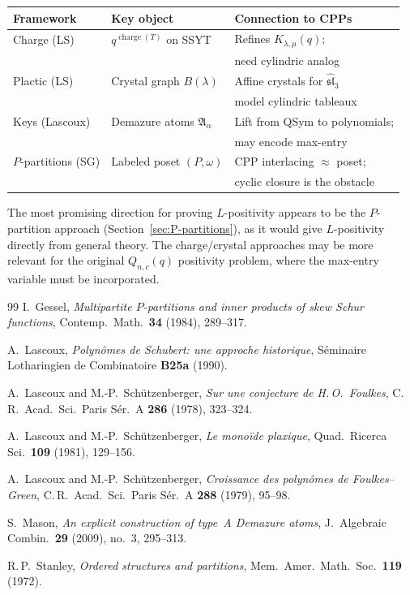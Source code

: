 \documentclass[11pt]{article}
\newcommand{\charge}{\operatorname{charge}}
\begin{document}
\begin{center}
\begin{tabular}{l|l|l}
  \textbf{Framework} & \textbf{Key object} & \textbf{Connection to CPPs} \\
  \hline
  Charge (LS) & $q^{\charge(T)}$ on SSYT
    & Refines $K_{\lambda,\mu}(q)$; \\
    & & need cylindric analog \\
  Plactic (LS) & Crystal graph $B(\lambda)$
    & Affine crystals for $\widehat{\mathfrak{sl}}_3$ \\
    & & model cylindric tableaux \\
  Keys (Lascoux) & Demazure atoms $\mathfrak{A}_\alpha$
    & Lift from QSym to polynomials; \\
    & & may encode max-entry \\
  $P$-partitions (SG) & Labeled poset $(P, \omega)$
    & CPP interlacing $\approx$ poset; \\
    & & cyclic closure is the obstacle
\end{tabular}
\end{center}

The most promising direction for proving $L$-positivity appears
to be the $P$-partition approach (Section~\ref{sec:P-partitions}),
as it would give $L$-positivity directly from general theory.
The charge/crystal approaches may be more relevant for the
original $Q_{n,c}(q)$ positivity problem, where the max-entry
variable must be incorporated.

\begin{thebibliography}{99}
I.~Gessel,
\emph{Multipartite $P$-partitions and inner products of skew
Schur functions},
Contemp.\ Math.\ \textbf{34} (1984), 289--317.

A.~Lascoux,
\emph{Polyn\^omes de Schubert: une approche historique},
S\'eminaire Lotharingien de Combinatoire \textbf{B25a} (1990).

A.~Lascoux and M.-P.~Sch\"utzenberger,
\emph{Sur une conjecture de H.\,O.~Foulkes},
C.\,R.\ Acad.\ Sci.\ Paris S\'er.~A \textbf{286} (1978), 323--324.

A.~Lascoux and M.-P.~Sch\"utzenberger,
\emph{Le mono\"ide plaxique},
Quad.\ Ricerca Sci.\ \textbf{109} (1981), 129--156.

A.~Lascoux and M.-P.~Sch\"utzenberger,
\emph{Croissance des polyn\^omes de Foulkes--Green},
C.\,R.\ Acad.\ Sci.\ Paris S\'er.~A \textbf{288} (1979), 95--98.

S.~Mason,
\emph{An explicit construction of type~A Demazure atoms},
J.~Algebraic Combin.\ \textbf{29} (2009), no.~3, 295--313.

R.\,P.~Stanley,
\emph{Ordered structures and partitions},
Mem.\ Amer.\ Math.\ Soc.\ \textbf{119} (1972).
\end{thebibliography}
\end{document}
